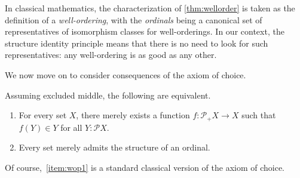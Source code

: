 In classical mathematics, the characterization of \autoref{thm:wellorder} is taken as the definition of a \emph{well-ordering}, with the \emph{ordinals} being a canonical set of representatives of isomorphism classes for well-orderings.
In our context, the structure identity principle means that there is no need to look for such representatives: any well-ordering is as good as any other.

We now move on to consider consequences of the axiom of choice.

\begin{thm}\label{thm:wop}
  Assuming excluded middle, the following are equivalent.
  \begin{enumerate}
  \item For every set $X$, there merely exists a function
    $ f: \mathcal{P}_+X \to X $
    such that $f(Y)\in Y$ for all $Y:\mathcal{P}X$.\label{item:wop1}
  \item Every set merely admits the structure of an ordinal.\label{item:wop2}
  \end{enumerate}
\end{thm}

Of course,~\ref{item:wop1} is a standard classical version of the axiom of choice.

